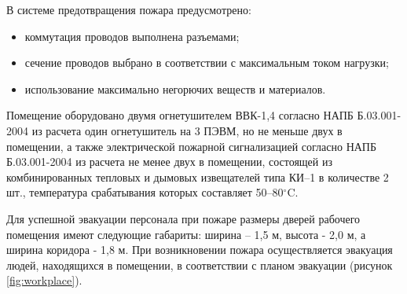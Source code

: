 В системе предотвращения пожара предусмотрено:

\begin{itemize}
    \item коммутация проводов выполнена разъемами;
    \item сечение проводов выбрано в соответствии с максимальным током нагрузки;
    \item использование максимально негорючих веществ и материалов.
\end{itemize}

Помещение оборудовано двумя огнетушителем ВВК-1,4 согласно НАПБ Б.03.001-2004  из расчета один огнетушитель на 3 ПЭВМ,
но не меньше двух в помещении, а также электрической пожарной сигнализацией согласно НАПБ Б.03.001-2004 из расчета 
не менее двух в помещении, состоящей из комбинированных тепловых и дымовых извещателей типа КИ–1 в количестве 2 шт.,
температура срабатывания которых составляет 50–80$^{\circ}\mathrm{C}$.

Для успешной эвакуации персонала при пожаре размеры дверей рабочего помещения имеют следующие габариты: 
ширина  – 1,5 м, высота -  2,0 м, а ширина коридора - 1,8 м.  При возникновении пожара осуществляется эвакуация людей, 
находящихся в помещении, в соответствии с планом эвакуации (рисунок \ref{fig:workplace}).

